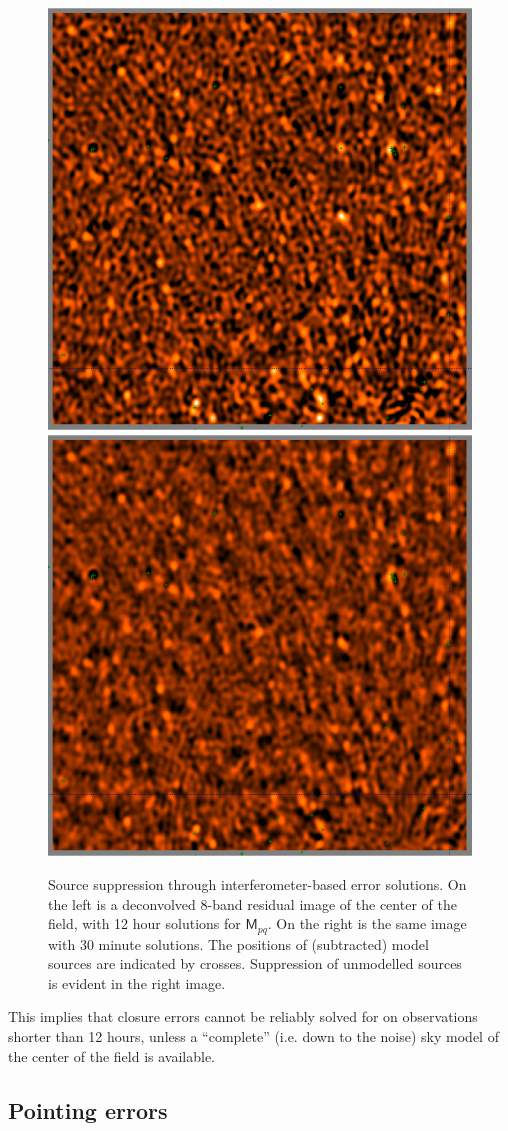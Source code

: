 \documentclass[]{aa}
\newcommand{\coh}[2]{\mathsf{{#1}}_{{#2}}}
\begin{document}
\begin{figure}
\begin{centering}
\includegraphics[width=.5\columnwidth]{IG_12h}%
\includegraphics[width=.5\columnwidth]{IG_30m}\par
\end{centering}
\caption{\label{fig:source-suppression}Source suppression through interferometer-based error solutions. On the left is a deconvolved 8-band residual image of the center of the field, with 12 hour solutions for $\coh{M}{pq}$. On the right is the same image with 30 minute solutions. The positions of (subtracted) model sources are indicated by crosses. Suppression of unmodelled sources is evident in the right image.
}
\end{figure}


This implies that closure errors cannot be reliably solved for on observations shorter than 12 hours, unless a ``complete'' (i.e. down to the noise) sky model of the center of the field is available.

\subsection{Pointing errors\label{sec:3C147:pointing}}
\end{document}
